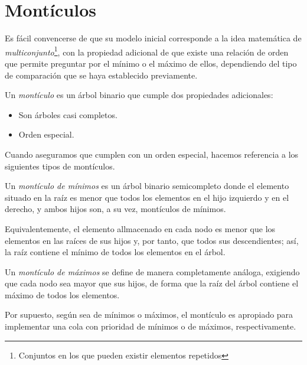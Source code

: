 \section{Montículos}
Es fácil convencerse de que su modelo inicial corresponde a la idea matemática de \textit{multiconjunto}\footnote{Conjuntos en los que pueden existir elementos repetidos}, con la propiedad adicional de que existe una relación de orden que permite preguntar por el mínimo o el máximo de ellos, dependiendo del tipo de comparación que se haya establecido previamente.\newline

\begin{defi}[Montículo]\label{def monticulo}
	Un \textit{montículo} es un árbol binario que cumple dos propiedades adicionales: 
	\begin{itemize}	
		\item Son árboles casi completos.
		\item Orden especial.
	\end{itemize}
\end{defi}

Cuando aseguramos que cumplen con un orden especial, hacemos referencia a los siguientes tipos de montículos.

\begin{defi}\label{def monticulo min}
	Un \textit{montículo de mínimos} es un árbol binario semicompleto donde el elemento situado en la raíz es menor que todos los elementos en el hijo izquierdo y en el derecho, y ambos hijos son, a su vez, montículos de mínimos.
\end{defi}

\begin{obs}
	Equivalentemente, el elemento allmacenado en cada nodo es menor que los elementos en las raíces de sus hijos y, por tanto, que todos sus descendientes; así, la raíz contiene el mínimo de todos los elementos en el árbol. 
\end{obs}

\begin{defi}\label{def monticulo max}
	Un \textit{montículo de máximos} se define de manera completamente análoga, exigiendo que cada nodo sea mayor que sus hijos, de forma que la raíz del árbol contiene el máximo de todos los elementos.
\end{defi}

Por supuesto, según sea de mínimos o máximos, el montículo es apropiado para implementar una cola con prioridad de mínimos o de máximos, respectivamente.\newline


